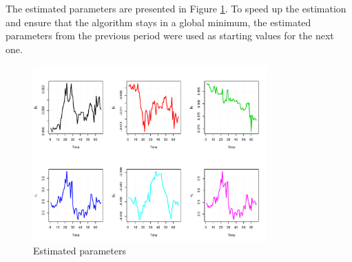 The estimated parameters are presented in Figure \ref{fig:paramdevel}. To speed up the estimation and ensure that the algorithm stays in a global minimum, the estimated parameters from the previous period were used as starting values for the next one.

\begin{figure}[htb]
  \begin{center}
\includegraphics[width=0.8\textwidth]{paramdevel}
  \caption{Estimated parameters}
\label{fig:paramdevel}
\end{center}
\end{figure}



